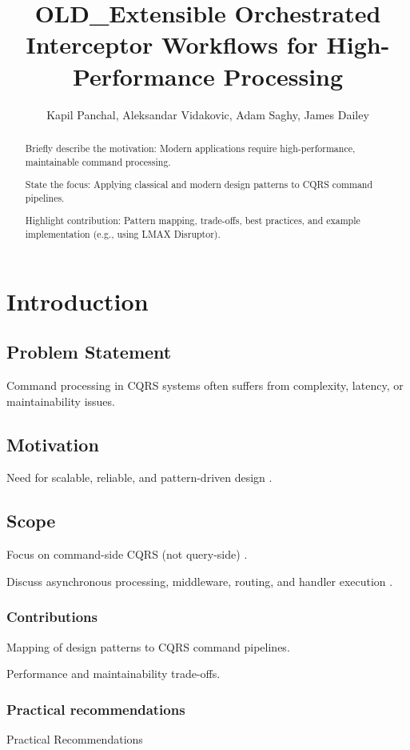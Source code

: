 \documentclass{article}
\title{OLD_Extensible Orchestrated Interceptor Workflows for High-Performance Processing}
\author{Kapil Panchal, Aleksandar Vidakovic, Adam Saghy, James Dailey}
\begin{document}
\maketitle

\begin{abstract}
Briefly describe the motivation: Modern applications require high-performance, maintainable command processing.

State the focus: Applying classical and modern design patterns to CQRS command pipelines.

Highlight contribution: Pattern mapping, trade-offs, best practices, and example implementation (e.g., using LMAX Disruptor).
\end{abstract}

\section{Introduction}

\subsection{Problem Statement} 
Command processing in CQRS systems often suffers from complexity, latency, or maintainability issues.

\subsection{Motivation} 
Need for scalable, reliable, and pattern-driven design \cite{fanInAnalyis}.

\subsection{Scope}
Focus on command-side CQRS (not query-side) \cite{pipelineArchitecture}.

Discuss asynchronous processing, middleware, routing, and handler execution \cite{crosscuttingPipelineArchitecture}.

\subsubsection{Contributions}

Mapping of design patterns to CQRS command pipelines.

Performance and maintainability trade-offs.

\subsubsection{Practical recommendations}
Practical Recommendations
\end{document}
